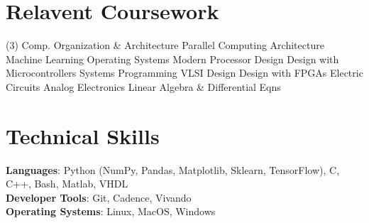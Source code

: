 \documentclass[letterpaper,11pt]{article}
\begin{document}

\section{Relavent Coursework}
\begin{tasks}(3)
    \task[] \small{Comp. Organization \& Architecture}
    \task[] \small{Parallel Computing Architecture}
    \task[] \small{Machine Learning}
    \task[] \small{Operating Systems}
    \task[] \small{Modern Processor Design}
    \task[] \small{Design with Microcontrollers}
    \task[] \small{Systems Programming}
    \task[] \small{VLSI Design}
    \task[] \small{Design with FPGAs}
    \task[] \small{Electric Circuits}
    \task[] \small{Analog Electronics}
    \task[] \small{Linear Algebra \& Differential Eqns}
    \end{tasks} 

\section{Technical Skills}
\begin{itemize}[leftmargin=0.15in, label={}]
    \small{\item{
                    \textbf{Languages}{: Python (NumPy, Pandas, Matplotlib, Sklearn, TensorFlow), C, C++, Bash, Matlab, VHDL } \\
                    \textbf{Developer Tools}{: Git, Cadence, Vivando} \\
                    \textbf{Operating Systems}{: Linux, MacOS, Windows}
              }}
\end{itemize}


\end{document}
